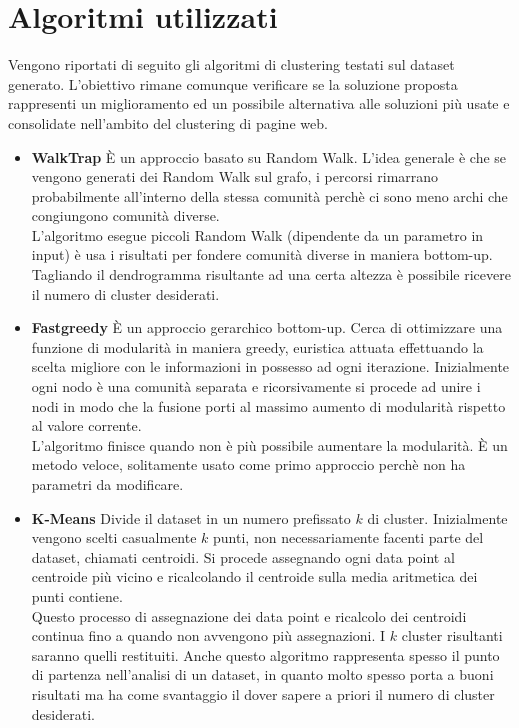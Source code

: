 \section{Algoritmi utilizzati}
Vengono riportati di seguito gli algoritmi di clustering testati sul dataset generato. L'obiettivo rimane comunque verificare se la soluzione proposta rappresenti un miglioramento ed un possibile alternativa alle soluzioni più usate e consolidate nell'ambito del clustering di pagine web.
\begin{itemize}
\item \textbf{WalkTrap}
È un approccio basato su Random Walk. L'idea generale è che se vengono generati dei Random Walk sul grafo, i percorsi rimarrano probabilmente all'interno della stessa comunità perchè ci sono meno archi che congiungono comunità diverse. 
\\
L'algoritmo esegue piccoli Random Walk (dipendente da un parametro in input) è usa i risultati per fondere comunità diverse in maniera bottom-up. Tagliando il dendrogramma risultante ad una certa altezza è possibile ricevere il numero di cluster desiderati.

\item \textbf{Fastgreedy}
È un approccio gerarchico bottom-up. Cerca di ottimizzare una funzione di modularità in maniera greedy, euristica attuata effettuando la scelta migliore con le informazioni in possesso ad ogni iterazione.
Inizialmente ogni nodo è una comunità separata e ricorsivamente si procede ad unire i nodi in modo che la fusione porti al massimo aumento di modularità rispetto al valore corrente. 
\\
L'algoritmo finisce quando non è più possibile aumentare la modularità. È un metodo veloce, solitamente usato come primo approccio perchè non ha parametri da modificare.
\item \textbf{K-Means}
Divide il dataset in un numero prefissato $k$ di cluster. Inizialmente vengono scelti casualmente $k$ punti, non necessariamente facenti parte del dataset, chiamati centroidi. Si procede assegnando ogni data point al centroide più vicino e ricalcolando il centroide sulla media aritmetica dei punti contiene. 
\\
Questo processo di assegnazione dei data point e ricalcolo dei centroidi continua fino a quando non avvengono più assegnazioni. I $k$ cluster risultanti saranno quelli restituiti. Anche questo algoritmo rappresenta spesso il punto di partenza nell'analisi di un dataset, in quanto molto spesso porta a buoni risultati ma ha come svantaggio il dover sapere a priori il numero di cluster desiderati.


\end{itemize}
